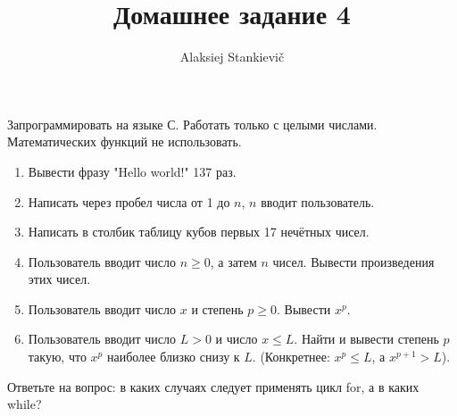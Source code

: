 \documentclass[12pt]{article}
\author{Alaksiej Stankievič}
\title{Домашнее задание 4}
\begin{document}
 Запрограммировать на языке С. Работать только с целыми числами. Математических функций не использовать.
 \begin{enumerate}
  \item Вывести фразу "Hello world!" 137 раз.
  \item Написать через пробел числа от 1 до $n$, $n$ вводит пользователь.
  \item Написать в столбик таблицу кубов первых 17 нечётных чисел.
  \item Пользователь вводит число $n\geq0$, а затем $n$ чисел. Вывести произведения этих чисел.
  \item Пользователь вводит число $x$ и степень $p\geq0$. Вывести $x^p$.
  \item Пользователь вводит число $L>0$ и число $x\leq{}L$. Найти и вывести степень $p$ такую, что 
  $x^p$ наиболее близко снизу к $L$. (Конкретнее: $x^p\leq{}L$, а $x^{p+1}>L$).
 \end{enumerate}
 
 Ответьте на вопрос: в каких случаях следует применять цикл for, а в каких while?
  
\end{document}
